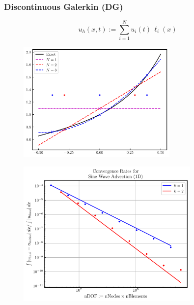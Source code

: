 \documentclass{beamer}
\begin{document}
\begin{frame}
\frametitle{Discontinuous Galerkin (DG)}

  \Fontvi

  \begin{equation*}
    u_{h}\left(x,t\right)
    :=\sum\limits_{i=1}^{N}
      u_{i}\left(t\right)\,\ell_{i}\left(x\right)
  \end{equation*}

  \begin{figure}[htb!]
    \centering
    \includegraphics[width=0.7\textwidth]{fig.DG_1D.png}
  \end{figure}

\end{frame}

\begin{frame}

  \begin{figure}[htb!]
    \centering
    \includegraphics[width=0.8\textwidth]{fig.ConvergenceRates.png}
  \end{figure}

\end{frame}
\end{document}
